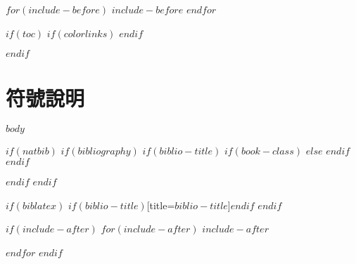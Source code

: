 \documentclass[$if(fontsize)$$fontsize$,$endif$$if(lang)$$babel-lang$,$endif$$if(papersize)$$papersize$paper,$endif$$for(classoption)$$classoption$$sep$,$endfor$]{$documentclass$}
\renewcommand{\chaptername}{}
\renewcommand{\thechapter}{第\zhnum{chapter}章}
\renewcommand{\thesection}{\arabic{chapter}.\arabic{section}}
\renewcommand{\thesubsection}{\thesection.\arabic{subsection}}
\begin{document}
$for(include-before)$
$include-before$
$endfor$

$if(toc)$
\begingroup
    \renewcommand{\contentsname}{\center 目錄 \addcontentsline{toc}{chapter}{目錄}}
    \renewcommand{\numberline}[1]{~#1\hspace*{1em}}
    $if(colorlinks)$
    \hypersetup{linkcolor=$if(toccolor)$$toccolor$$else$black$endif$}
    $endif$
    \setcounter{tocdepth}{$toc-depth$}
    \tableofcontents
    \newcommand{\lotlabel}{表}
    \renewcommand{\listtablename}{\center 表目錄 \addcontentsline{toc}{chapter}{表目錄}}
    \renewcommand{\numberline}[1]{\lotlabel~#1\hspace*{1em}}
    \listoftables
    \newcommand{\loflabel}{圖}
    \renewcommand{\listfigurename}{\center 圖目錄 \addcontentsline{toc}{chapter}{圖目錄}}
    \renewcommand{\numberline}[1]{\loflabel~#1\hspace*{1em}}
    \listoffigures
\endgroup
$endif$

\chapter*{符號說明}
\fontsize{14}{21}\selectfont{$symbols$}

\mainmatter
$body$

$if(natbib)$
$if(bibliography)$
    \renewcommand{\chaptername}{}
    \renewcommand{\thechapter}{}
    $if(biblio-title)$
        $if(book-class)$
        \renewcommand\bibname{$biblio-title$}
        $else$
        \renewcommand\refname{$biblio-title$}
        $endif$
    $endif$
    
$endif$
$endif$

$if(biblatex)$
\printbibliography$if(biblio-title)$[title=$biblio-title$]$endif$
$endif$


$if(include-after)$
\setcounter{appendix_counter}{1}
\renewcommand{\thechapter}{附錄\zhnum{appendix_counter}}
\renewcommand{\thesection}{\arabic{section}.}
\renewcommand{\thesubsection}{\arabic{section}-\arabic{subsection}}
$for(include-after)$
\newpage
$include-after$
\addtocounter{appendix_counter}{1}
$endfor$
$endif$

\end{document}
